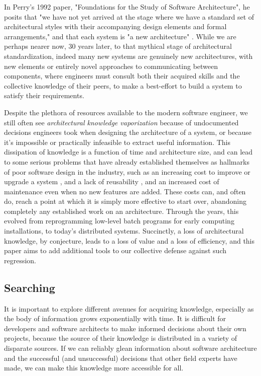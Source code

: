 \documentclass[a4paper, 12pt]{article}
\begin{document}
		In Perry's 1992 paper, "Foundations for the Study of Software Architecture", he posits that "we have not yet arrived at the stage where we have a standard set of architectural styles with their accompanying design elements and formal arrangements," and that each system is "a new architecture" \cite{perry}. While we are perhaps nearer now, 30 years later, to that mythical stage of architectural standardization, indeed many new systems are genuinely new architectures, with new elements or entirely novel approaches to communicating between components, where engineers must consult both their acquired skills and the collective knowledge of their peers, to make a best-effort to build a system to satisfy their requirements.
		
		Despite the plethora of resources available to the modern software engineer, we still often see \textit{architectural knowledge vaporization}\cite{jansen} because of undocumented decisions engineers took when designing the architecture of a system, or because it's impossible or practically infeasible to extract useful information. This dissipation of knowledge is a function of time and architecture size, and can lead to some serious problems that have already established themselves as hallmarks of poor software design in the industry, such as an increasing cost to improve or upgrade a system \cite{jansen, perry}, and a lack of reusability \cite{jansen}, and an increased cost of maintenance \cite{randell} even when no new features are added. These costs can, and often do, reach a point at which it is simply more effective to start over, abandoning completely any established work on an architecture. Through the years, this evolved from reprogramming low-level batch programs for early computing installations\cite{randell}, to today's distributed systems. Succinctly, a loss of architectural knowledge, by conjecture, leads to a loss of value and a loss of efficiency, and this paper aims to add additional tools to our collective defense against such regression.
		
	\subsection{Searching}
		It is important to explore different avenues for acquiring knowledge, especially as the body of information grows exponentially with time. It is difficult for developers and software architects to make informed decisions about their own projects, because the source of their knowledge is distributed in a variety of disparate sources. If we can reliably glean information about software architecture and the successful (and unsuccessful) decisions that other field experts have made, we can make this knowledge more accessible for all.
		
\end{document}
